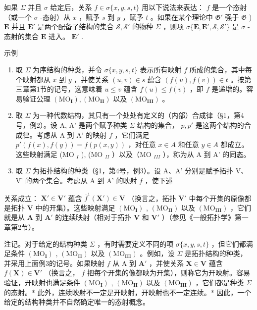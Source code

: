 如果 \(\Sigma\) 并且 \(\sigma\) 给定后，关系 \(f \in \sigma\{x, y, s, t\}\) 用以下说法来表达： \(f\) 是一个态射（或一个 \(\sigma\) -态射）从 \(x\) ，赋予 \(s\) 到 \(y\) ，赋予 \(t\) 。如果在某个理论中 \(\mathfrak{G}'\) 强于 \(\mathfrak{G}\) ) \(\mathbf{E}\) 并且 \(\mathbf{E}'\) 是两个配备了结构的集合 \(\mathcal{S}, \mathcal{S}'\) 的物种 \(\Sigma\) ，则项 \(\sigma\{\mathbf{E}, \mathbf{E}', \mathcal{S}, \mathcal{S}'\}\) 是 \(\sigma\) -态射的集合 \(\mathbf{E}\) 进入。 \(\mathbf{E}'\) .

示例

\begin{enumerate}
\def\labelenumi{(\arabic{enumi})}
\item
  取 \(\Sigma\) 为序结构的种类，并令 \(\sigma\{x, y, s, t\}\) 表示所有映射 \(f\) 所成的集合，其中每个映射都从 \(x\) 到 \(y\) ，并使关系 \((u, v) \in s\) 蕴含 \((f(u), f(v)) \in t\) 。按第三章第1节的记号，这意味着 \(u \leqslant v\) 蕴含 \(f(u) \leqslant f(v)\) ，即 \(f\) 是递增的。容易验证公理 \((\mathrm{MO}_{\mathbf{I}}), (\mathrm{MO}_{\mathbf{II}})\) 以及 \((\mathrm{MO}_{\mathbf{III}})\) 。
\item
  取 \(\Sigma\) 为一种代数结构，其只有一个处处有定义的（内部）合成律（§1，第4号，例2）。设 A, A' 是两个赋予种类 \(\Sigma\) 结构的集合， \(p, p'\) 是这两个结构的合成律。考虑从 A 到 A' 的映射 \(f\) ，它们满足 \(p'(f(x), f(y)) = f(p(x, y))\) ，对任意 \(x \in A\) 和任意 \(y \in A\) 都成立。这些映射满足 (MO \(_{I}\) ), (MO \(_{II}\) ）以及（MO \(_{III}\) ），称为从 A 到 A' 的同态。
\item
  取 \(\Sigma\) 为拓扑结构的种类（§1，第4号，例3）。设 A、A' 分别是赋予拓扑 V、V' 的两个集合。考虑从 A 到 A' 的映射 \(f\) ，使下述
\end{enumerate}

关系成立： \(\mathbf{X}' \in \mathbf{V}'\) 蕴含 \(\overline{f}^{1}(\mathbf{X}') \in \mathbf{V}\) （换言之，拓扑 \(\mathbf{V}'\) 中每个开集的原像都是拓扑 \(\mathbf{V}\) 中的开集）。这些映射满足 \((\mathrm{MO}_{\mathbf{I}})\) , \((\mathrm{MO}_{\mathbf{II}})\) 以及 \((\mathrm{MO}_{\mathbf{III}})\) ，它们就是从 \(\mathbf{A}\) 到 \(\mathbf{A}'\) 的连续映射（相对于拓扑 \(\mathbf{V}\) 和 \(\mathbf{V}'\) ）（参见《一般拓扑学》第一章第2节）。

注记。对于给定的结构种类 \(\Sigma\) ，有时需要定义不同的项 \(\sigma \{x, y, s, t\}\) ，但它们都满足条件 \((\mathrm{MO}_{\mathbf{I}})\) , \((\mathrm{MO}_{\mathbf{II}})\) 以及 \((\mathrm{MO}_{\mathbf{III}})\) 。例如，设 \(\Sigma\) 是拓扑结构的种类，并采用上面例3的记号。如果映射 \(f\) 从 A 到 \(\mathbf{A}'\) ，并使关系 \(\mathbf{X} \in \mathbf{V}\) 蕴含 \(f(\mathbf{X}) \in \mathbf{V}'\) （换言之， \(f\) 把每个开集的像都映为开集），则称它为开映射。容易验证，开映射也满足条件 \((\mathrm{MO}_{\mathbf{I}})\) , \((\mathrm{MO}_{\mathbf{II}})\) 以及 \((\mathrm{MO}_{\mathbf{III}})\) ，它们都是种类 \(\Sigma\) 的态射。* 此外，连续映射不一定是开映射，开映射也不一定连续。* 因此，一个给定的结构种类并不自然确定唯一的态射概念。

